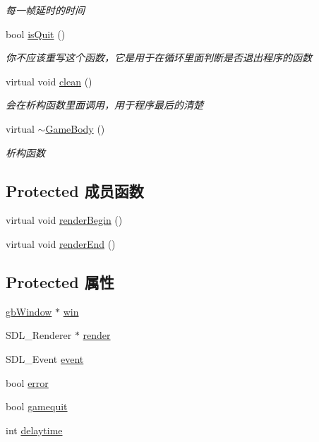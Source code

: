 \begin{DoxyCompactItemize}
\begin{DoxyCompactList}\small\item\em 每一帧延时的时间 \end{DoxyCompactList}\item 
bool \mbox{\hyperlink{class_game_body_a9ec4c012ae72dd25d849d6ebacb9357c}{is\+Quit}} ()
\begin{DoxyCompactList}\small\item\em 你不应该重写这个函数，它是用于在循环里面判断是否退出程序的函数 \end{DoxyCompactList}\item 
virtual void \mbox{\hyperlink{class_game_body_a804c0e5d53cf79d8b4262ece694be204}{clean}} ()
\begin{DoxyCompactList}\small\item\em 会在析构函数里面调用，用于程序最后的清楚 \end{DoxyCompactList}\item 
virtual \mbox{\hyperlink{class_game_body_af13feb5fae1c033d524dae6210dd58ef}{$\sim$\+Game\+Body}} ()
\begin{DoxyCompactList}\small\item\em 析构函数 \end{DoxyCompactList}\end{DoxyCompactItemize}
\subsection*{Protected 成员函数}
\begin{DoxyCompactItemize}
\item 
virtual void \mbox{\hyperlink{class_game_body_a05ce167838e2b7248090e62d85e9f5b0}{render\+Begin}} ()
\item 
virtual void \mbox{\hyperlink{class_game_body_a630601ce51c48d11096afcfbafa9516f}{render\+End}} ()
\end{DoxyCompactItemize}
\subsection*{Protected 属性}
\begin{DoxyCompactItemize}
\item 
\mbox{\hyperlink{classgb_window}{gb\+Window}} $\ast$ \mbox{\hyperlink{class_game_body_a66e2f55c012e92d4723a08a642722777}{win}}
\item 
S\+D\+L\+\_\+\+Renderer $\ast$ \mbox{\hyperlink{class_game_body_a7325fa39af4c769a643b9bc5805a0e28}{render}}
\item 
S\+D\+L\+\_\+\+Event \mbox{\hyperlink{class_game_body_a7a7f0234ae77e1aae482522badaca124}{event}}
\item 
bool \mbox{\hyperlink{class_game_body_a82d0d6fedddd6b802691d3b35e699141}{error}}
\item 
bool \mbox{\hyperlink{class_game_body_ae2777759c863e6610b0aa90888c99b95}{gamequit}}
\item 
int \mbox{\hyperlink{class_game_body_a7a92a21e03a1032a60fa925d21d4a54a}{delaytime}}
\end{DoxyCompactItemize}


